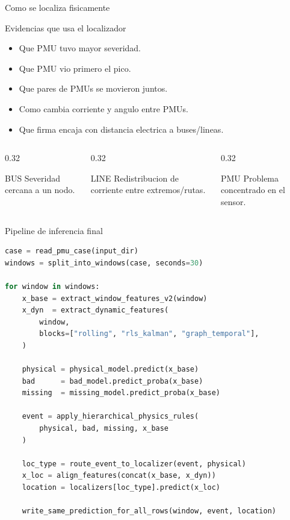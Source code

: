 \documentclass[10pt,aspectratio=169]{beamer}
\begin{document}
\begin{frame}{Como se localiza fisicamente}
\small
\begin{block}{Evidencias que usa el localizador}
\begin{itemize}
  \item Que PMU tuvo mayor severidad.
  \item Que PMU vio primero el pico.
  \item Que pares de PMUs se movieron juntos.
  \item Como cambia corriente y angulo entre PMUs.
  \item Que firma encaja con distancia electrica a buses/lineas.
\end{itemize}
\end{block}
\begin{columns}[T,totalwidth=\textwidth]
\begin{column}{0.32\textwidth}
\begin{exampleblock}{BUS}
Severidad cercana a un nodo.
\end{exampleblock}
\end{column}
\begin{column}{0.32\textwidth}
\begin{exampleblock}{LINE}
Redistribucion de corriente entre extremos/rutas.
\end{exampleblock}
\end{column}
\begin{column}{0.32\textwidth}
\begin{exampleblock}{PMU}
Problema concentrado en el sensor.
\end{exampleblock}
\end{column}
\end{columns}
\end{frame}

\begin{frame}[fragile]{Pipeline de inferencia final}
\small
\begin{lstlisting}[language=Python]
case = read_pmu_case(input_dir)
windows = split_into_windows(case, seconds=30)

for window in windows:
    x_base = extract_window_features_v2(window)
    x_dyn  = extract_dynamic_features(
        window,
        blocks=["rolling", "rls_kalman", "graph_temporal"],
    )

    physical = physical_model.predict(x_base)
    bad      = bad_model.predict_proba(x_base)
    missing  = missing_model.predict_proba(x_base)

    event = apply_hierarchical_physics_rules(
        physical, bad, missing, x_base
    )

    loc_type = route_event_to_localizer(event, physical)
    x_loc = align_features(concat(x_base, x_dyn))
    location = localizers[loc_type].predict(x_loc)

    write_same_prediction_for_all_rows(window, event, location)
\end{lstlisting}
\end{frame}
\end{document}
